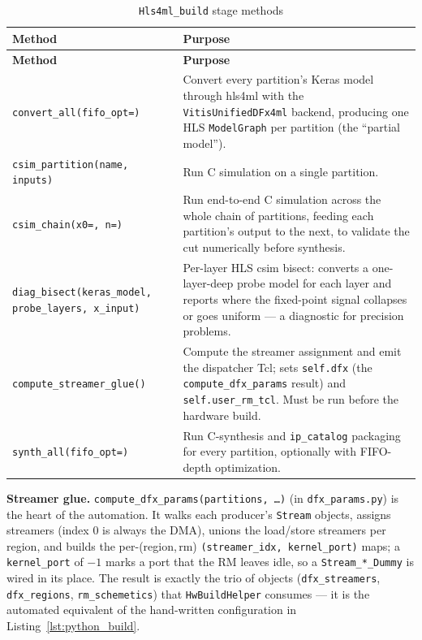 \documentclass{cernatsnote}
\begin{document}
\begin{longtable}{|L{4cm}|L{8.8cm}|}
\caption{\texttt{Hls4ml\_build} stage methods}
\label{tab:hls4ml_build_methods} \\
\hline
\textbf{Method} & \textbf{Purpose} \\
\hline
\endfirsthead
\hline
\textbf{Method} & \textbf{Purpose} \\
\hline
\endhead
\hline
\endfoot
\texttt{convert\_all(\allowbreak fifo\_opt=)} & Convert every partition's Keras model through hls4ml with the \texttt{VitisUnifiedDFx4ml} backend, producing one HLS \texttt{ModelGraph} per partition (the ``partial model''). \\
\hline
\texttt{csim\_partition(\allowbreak name, inputs)} & Run C simulation on a single partition. \\
\hline
\texttt{csim\_chain(x0=, n=)} & Run end-to-end C simulation across the whole chain of partitions, feeding each partition's output to the next, to validate the cut numerically before synthesis. \\
\hline
\texttt{diag\_bisect(\allowbreak keras\_model, \allowbreak probe\_layers, \allowbreak x\_input)} & Per-layer HLS csim bisect: converts a one-layer-deep probe model for each layer and reports where the fixed-point signal collapses or goes uniform --- a diagnostic for precision problems. \\
\hline
\texttt{compute\_\allowbreak streamer\_glue()} & Compute the streamer assignment and emit the dispatcher Tcl; sets \texttt{self.dfx} (the \texttt{compute\_dfx\_params} result) and \texttt{self.user\_rm\_tcl}. Must be run before the hardware build. \\
\hline
\texttt{synth\_all(\allowbreak fifo\_opt=)} & Run C-synthesis and \texttt{ip\_catalog} packaging for every partition, optionally with FIFO-depth optimization. \\
\hline
\end{longtable} 

\noindent\textbf{Streamer glue.}
\texttt{compute\_dfx\_params(\allowbreak partitions, \dots)} (in \texttt{dfx\_params.py}) is the
heart of the automation. It walks each producer's \texttt{Stream} objects, assigns
streamers (index 0 is always the DMA), unions the load/store streamers per region,
and builds the per-(region,\,rm) \texttt{(streamer\_idx, kernel\_port)} maps; a
\texttt{kernel\_port} of $-1$ marks a port that the RM leaves idle, so a
\texttt{Stream\_*\_Dummy} is wired in its place. The result is exactly the trio of
objects (\texttt{dfx\_streamers}, \texttt{dfx\_regions}, \texttt{rm\_schemetics})
that \texttt{HwBuildHelper} consumes --- it is the automated equivalent of the
hand-written configuration in Listing~\ref{lst:python_build}.
\end{document}
